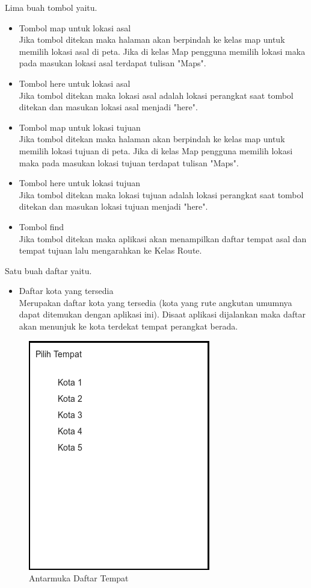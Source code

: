 Lima buah tombol yaitu. 
\begin{itemize}
	\item Tombol map untuk lokasi asal\\
	Jika tombol ditekan maka halaman akan berpindah ke kelas map untuk memilih lokasi asal di peta. Jika di kelas Map pengguna memilih lokasi maka pada masukan lokasi asal terdapat tulisan "Maps".
	\item Tombol here untuk lokasi asal\\
	Jika tombol ditekan maka lokasi asal adalah lokasi perangkat saat tombol ditekan dan masukan lokasi asal menjadi "here".
	\item Tombol map untuk lokasi tujuan\\
	Jika tombol ditekan maka halaman akan berpindah ke kelas map untuk memilih lokasi tujuan di peta. Jika di kelas Map pengguna memilih lokasi maka pada masukan lokasi tujuan terdapat tulisan "Maps".
	\item Tombol here untuk lokasi tujuan\\
	Jika tombol ditekan maka lokasi tujuan adalah lokasi perangkat saat tombol ditekan dan masukan lokasi tujuan menjadi "here".
	\item Tombol find\\
	Jika tombol ditekan maka aplikasi akan menampilkan daftar tempat asal dan tempat tujuan lalu mengarahkan ke Kelas Route.
\end{itemize}

Satu buah daftar yaitu.
\begin{itemize}
	\item Daftar kota yang tersedia\\
	Merupakan daftar kota yang tersedia (kota yang rute angkutan umumnya dapat ditemukan dengan aplikasi ini). Disaat aplikasi dijalankan maka daftar akan menunjuk ke kota terdekat tempat perangkat berada.
\end{itemize}

\begin{figure}[h]
	\centering
		\includegraphics[scale=0.6]{Gambar/perancangan_antarmuka/ListTempat}
	\caption{Antarmuka Daftar Tempat}
	\label{fig:Antarmuka Daftar Tempat}
\end{figure}

